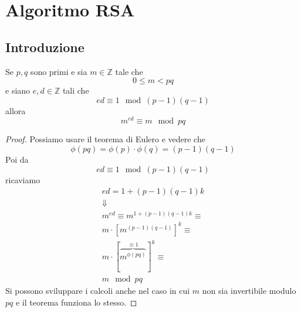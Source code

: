 \chapter{Algoritmo RSA}
\section{Introduzione}
\begin{theorem}[RSA]
	Se $p, q$ sono primi e sia $m \in \mathbb{Z}$ tale che
	\begin{equation*}
		0 \leq m < pq
	\end{equation*}
	e siano $e, d \in \mathbb{Z}$ tali che
	\begin{equation*}
		ed \equiv 1 \mod{(p - 1)(q - 1)}
	\end{equation*}
	allora
	\begin{equation*}
		m^{ed} \equiv m \mod{pq}
	\end{equation*}
	\begin{proof}
		Possiamo usare il teorema di Eulero e vedere che
		\begin{equation*}
			\phi (pq) = \phi (p) \cdot \phi(q) = (p - 1)(q - 1)
		\end{equation*}
		Poi da
		\begin{equation*}
			ed \equiv 1 \mod{(p - 1)(q - 1)}
		\end{equation*}
		ricaviamo
		\begin{equation*}
			\begin{array}{c}
				ed = 1 + (p - 1)(q - 1)k                                \\
				\Downarrow                                              \\
				m^{ed} \equiv m^{1 + (p - 1)(q - 1)k} \equiv            \\
				m \cdot [m^{(p - 1)(q - 1)}]^k \equiv                   \\
				m \cdot [\overbrace{m^{\phi (pq)}}^{\equiv 1}]^k \equiv \\
				m \mod{pq}
			\end{array}
		\end{equation*}
		Si possono sviluppare i calcoli anche nel caso in cui $m$ non sia invertibile modulo $pq$
		e il teorema funziona lo stesso.
	\end{proof}
\end{theorem}

